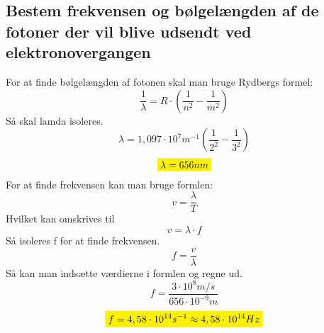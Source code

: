 \subsection{Bestem frekvensen og bølgelængden af de fotoner der vil blive udsendt ved elektronovergangen}
For at finde bølgelængden af fotonen skal man bruge Rydbergs formel: 
\begin{equation*}
    \frac{1}{\lambda}=R \cdot (\frac{1}{n^2} - \frac{1}{m^2} )
\end{equation*}
Så skal lamda isoleres. 
\begin{equation*}
    \lambda = 1,097 \cdot 10^7 m^{-1} (\frac{1}{2^2} - \frac{1}{3^2} )
\end{equation*}
\begin{equation*}
    \mathcolorbox{yellow}{\lambda = 656 nm}
\end{equation*}
For at finde frekvensen kan man bruge formlen:
\begin{equation*}
    v=\frac{\lambda}{T}
\end{equation*}
Hvilket kan omskrives til 
\begin{equation*}
    v=\lambda \cdot f
\end{equation*}
Så isoleres f for at finde frekvensen.
\begin{equation*}
    f=\frac{v}{\lambda}
\end{equation*}
Så kan man indsætte værdierne i formlen og regne ud.
\begin{equation*}
    f=\frac{3 \cdot 10^8 m/s}{656 \cdot 10^{-9} m}
\end{equation*}
\begin{equation*}
    \mathcolorbox{yellow}{f=4,58 \cdot 10^{14} s^{-1} \approx 4,58 \cdot 10^{14} Hz}
\end{equation*}
\newpage
